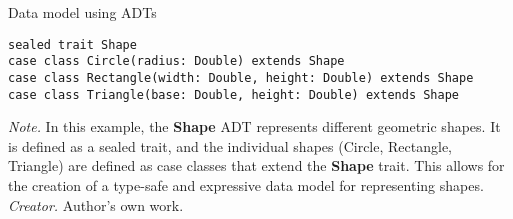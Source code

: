 \begin{table}[h!]
\caption{Data model using ADTs}
\begin{lstlisting}
sealed trait Shape
case class Circle(radius: Double) extends Shape
case class Rectangle(width: Double, height: Double) extends Shape
case class Triangle(base: Double, height: Double) extends Shape
\end{lstlisting}
\small
\textit{Note.} In this example, the \textbf{Shape} ADT represents different geometric shapes. It is defined as a sealed trait, and the individual shapes (Circle, Rectangle, Triangle) are defined as case classes that extend the \textbf{Shape} trait. This allows for the creation of a type-safe and expressive data model for representing shapes.
\textit{Creator.} Author's own work.
\end{table}